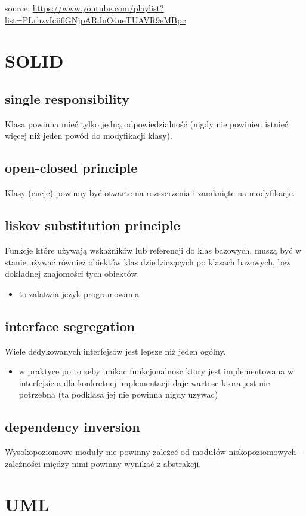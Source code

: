 \documentclass[11pt]{article}
\author{Patryk Kaniewski}
\date{\today}
\title{}
\begin{document}
\tableofcontents \clearpageOP source: \url{https://www.youtube.com/playlist?list=PLrhzvIcii6GNjpARdnO4ueTUAVR9eMBpc}
\section{SOLID}
\label{sec:org59768d4}
\subsection{single responsibility}
\label{sec:org6a0266b}
Klasa powinna mieć tylko jedną odpowiedzialność (nigdy nie powinien istnieć więcej niż jeden powód do modyfikacji klasy).
\subsection{open-closed principle}
\label{sec:org74bee9b}
Klasy (encje) powinny być otwarte na rozszerzenia i zamknięte na modyfikacje.
\subsection{liskov substitution principle}
\label{sec:org478c200}
Funkcje które używają wskaźników lub referencji do klas bazowych, muszą być w stanie używać również obiektów klas dziedziczących po klasach bazowych, bez dokładnej znajomości tych obiektów.
\begin{itemize}
\item to zalatwia jezyk programowania
\end{itemize}
\subsection{interface segregation}
\label{sec:orgae48cc6}
Wiele dedykowanych interfejsów jest lepsze niż jeden ogólny.
\begin{itemize}
\item w praktyce po to zeby unikac funkcjonalnosc ktory jest implementowana w interfejsie a dla konkretnej implementacji daje wartosc ktora jest nie potrzebna (ta podklasa jej nie powinna nigdy uzywac)
\end{itemize}
\subsection{dependency inversion}
\label{sec:org0ca29da}
Wysokopoziomowe moduły nie powinny zależeć od modułów niskopoziomowych - zależności między nimi powinny wynikać z abstrakcji.

\section{UML}
\label{sec:org6b83872}
\end{document}
